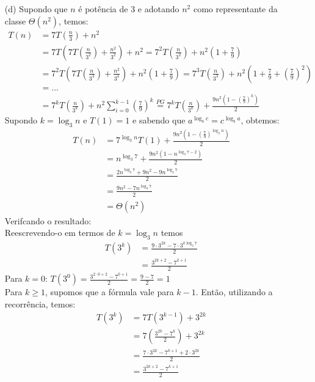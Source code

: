 \documentclass[12pt, a4paper]{article} %
\begin{document}
\begin{enumerate}
\begin{enumerate}
\item[(d)]
Supondo que $n$ é potência de 3 e adotando $n^2$ como representante da classe
$\Theta(n^2)$, temos:
\begin{align*}
T(n) &= 7T\left(\frac{n}{3}\right) + n^2\\
     &= 7T\left(7T\left(\frac{n}{3^2}\right) + \frac{n^2}{3^2}\right) + n^2 = 7^2T\left(\frac{n}{3^2}\right) + n^2\left(1 + \frac{7}{9}\right)\\
     &= 7^2T\left(7T\left(\frac{n}{3^3}\right) + \frac{n^2}{3^4}\right) + n^2\left(1 + \frac{7}{9}\right) = 7^3T\left(\frac{n}{3^3}\right) + n^2\left(1 + \frac{7}{9} + \left(\frac{7}{9}\right)^2\right)\\
     &= ...\\
     &= 7^kT\left(\frac{n}{3^k}\right) + n^2\sum_{i=0}^{k-1}\left(\frac{7}{9}\right)^k \stackrel{PG}{=} 7^kT\left(\frac{n}{3^k}\right) + \frac{9n^2\left(1-\left(\frac{7}{9}\right)^k\right)}{2}
\end{align*}
Supondo $k = \log_3 n$ e $T(1) = 1$ e sabendo que $a^{\log_b c} = c^{\log_b a}$, obtemos:
\begin{align*}
T(n) &= 7^{\log_3 n}T(1) + \frac{9n^2\left(1-\left(\frac{7}{9}\right)^{\log_3 n}\right)}{2}\\
     &= n^{\log_3 7} + \frac{9n^2(1-n^{\log_3 7 - 2})}{2}\\
     &= \frac{2n^{\log_3 7} + 9n^2 - 9n^{\log_3 7}}{2}\\
     &= \frac{9n^2 - 7n^{\log_3 7}}{2}\\
     &= \Theta(n^2)
\end{align*}
Verifcando o resultado:\\
Reescrevendo-o em termos de $k = \log_3 n$ temos
\begin{align*}
T(3^k) &= \frac{9\cdot 3^{2k} - 7\cdot 3^{k\log_3 7}}{2}\\
       &= \frac{3^{2k+2} - 7^{k+1}}{2}
\end{align*}
Para $k = 0$: $T(3^0) = \frac{3^{2\cdot 0 + 2} - 7^{0+1}}{2} = \frac{9 - 7}{2} = 1$\\
Para $k \geqslant 1$, supomos que a fórmula vale para $k - 1$. Então, utilizando
a recorrência, temos:
\begin{align*}
T(3^k) &= 7T(3^{k-1}) + 3^{2k}\\
       &= 7\left(\frac{3^{2k} - 7^k}{2}\right) + 3^{2k}\\
       &= \frac{7\cdot 3^{2k} - 7^{k+1} + 2\cdot 3^{2k}}{2} \\
       &= \frac{3^{2k + 2} - 7^{k+1}}{2}
\end{align*}
\end{enumerate}


\end{enumerate}
\end{document}
